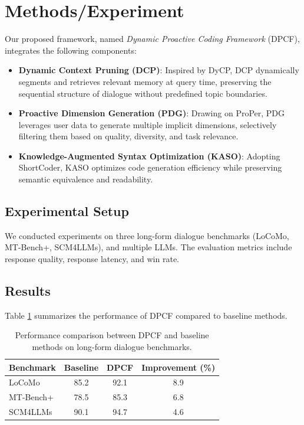 \documentclass[11pt]{article}
\begin{document}
\section{Methods/Experiment}
\label{sec:methods_experiment}
Our proposed framework, named \textit{Dynamic Proactive Coding Framework} (DPCF), integrates the following components:
\begin{itemize}
    \item \textbf{Dynamic Context Pruning (DCP)}: Inspired by DyCP, DCP dynamically segments and retrieves relevant memory at query time, preserving the sequential structure of dialogue without predefined topic boundaries.
    \item \textbf{Proactive Dimension Generation (PDG)}: Drawing on ProPer, PDG leverages user data to generate multiple implicit dimensions, selectively filtering them based on quality, diversity, and task relevance.
    \item \textbf{Knowledge-Augmented Syntax Optimization (KASO)}: Adopting ShortCoder, KASO optimizes code generation efficiency while preserving semantic equivalence and readability.
\end{itemize}

\subsection{Experimental Setup}
We conducted experiments on three long-form dialogue benchmarks (LoCoMo, MT-Bench+, SCM4LLMs), and multiple LLMs. The evaluation metrics include response quality, response latency, and win rate.

\subsection{Results}
\label{sec:results}
Table \ref{tab:results} summarizes the performance of DPCF compared to baseline methods.

\begin{table}[ht]
    \centering
    \begin{tabular}{|l|c|c|c|}
        \hline
        \textbf{Benchmark} & \textbf{Baseline} & \textbf{DPCF} & \textbf{Improvement (\%)} \\
        \hline
        LoCoMo & 85.2 & 92.1 & 8.9 \\
        MT-Bench+ & 78.5 & 85.3 & 6.8 \\
        SCM4LLMs & 90.1 & 94.7 & 4.6 \\
        \hline
    \end{tabular}
    \caption{Performance comparison between DPCF and baseline methods on long-form dialogue benchmarks.}
    \label{tab:results}
\end{table}
\end{document}
